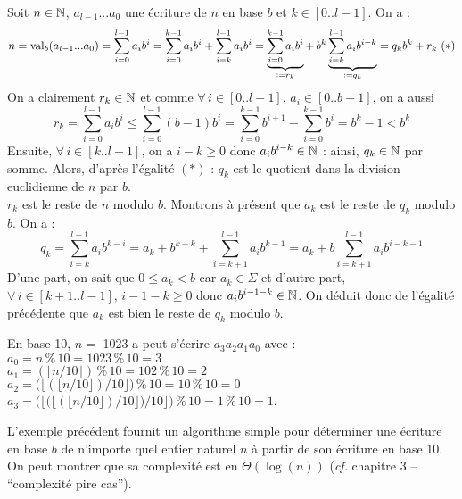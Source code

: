 			\eqskip{2mm}
			\begin{Preuve}
				Soit \(n\in\mathbb{N}\), \(a_{l-1}...a_0\) une écriture de \(n\) en base \(b\) et \(k\in[0..l-1]\). On a :
					\[
						n = \operatorname{val}_b(a_{l-1}...a_0) = \sum_{i=0}^{l-1} a_ib^i = \sum_{i=0}^{k-1} a_ib^i + \sum_{i=k}^{l-1} a_ib^i = \underbrace{\sum_{i=0}^{k-1} a_ib^i}_{:=r_k} + \,b^k \underbrace{\sum_{i=k}^{l-1} a_ib^{i-k}}_{:=q_k} = q_kb^k + r_k \text{ } (*)
					\]
				On a clairement \(r_k \in \mathbb{N}\) et comme \(\forall\,i\in[0..l-1]\), \(a_i\in[0..b-1]\), on a aussi
					\[
						r_k = \sum_{i=0}^{l-1}a_ib^i \leq \sum_{i=0}^{l-1} (b-1)b^i = \sum_{i=0}^{k-1}b^{i+1} - \sum_{i=0}^{k-1}b^i = b^k-1 < b^k
					\]
				Ensuite, \(\forall\, i\in[k..l-1]\), on a \(i-k\geq 0\) donc \(a_ib^{i-k} \in \mathbb{N}\) : ainsi, \(q_k \in \mathbb{N}\) par somme. \nt
				Alors, d'après l'égalité \((*)\) : \bdot \(q_k\) est le quotient dans la division euclidienne de \(n\) par \(b\). \\
				 \bdot \(r_k\) est le reste de \(n\) modulo \(b\). \nt
				Montrons à présent que \(a_k\) est le reste de \(q_k\) modulo \(b\). On a :
					\[
						q_k = \sum_{i=k}^{l-1} a_ib^{k-i} = a_k + b^{k-k} + \sum_{i=k+1}^{l-1} a_ib^{k-1} = a_k + b\sum_{i=k+1}^{l-1} a_ib^{i-k-1}
					\]
				D'une part, on sait que \(0 \leq a_k < b\) car \(a_k \in \Sigma\) et d'autre part, \(\forall\,i\in[k+1..l-1], \,i-1-k \geq 0\) donc \(a_ib^{i-1-k} \in \mathbb{N}\). On déduit donc de l'égalité précédente que \(a_k\) est bien le reste de \(q_k\) modulo \(b\).
			\end{Preuve}
			
			\begin{Exemple}
				En base 10, \(n = \) 1023 a peut s'écrire \(a_3a_2a_1a_0\) avec : \\
				 \(a_0 = n \,\%\, 10 = 1023\,\%\,10 = 3\) \\
				 \(a_1 = (\lfloor n/10 \rfloor)\,\%\,10 = 102\,\%\,10 = 2\) \\
				 \(a_2 = \big(\big\lfloor (\lfloor n/10 \rfloor)/10 \big\rfloor\big)\,\%\,10 = 10\,\%\,10 = 0\) \\[0.5mm]
				 \(a_3 = \Big(\Big\lfloor\big(\big\lfloor (\lfloor n/10 \rfloor)/10 \big\rfloor\big)/10\Big\rfloor\Big)\,\%\,10 = 1 \,\%\,10 = 1\). \\
			\end{Exemple}
			
			\begin{Remarque}
				L'exemple précédent fournit un algorithme simple pour déterminer une écriture en base \(b\) de n'importe quel entier naturel \(n\) à partir de son écriture en base 10. On peut montrer que sa complexité est en \(\Theta(\log(n))\) (\emph{cf.} chapitre 3 -- ``complexité pire cas'').
			\end{Remarque}
		
